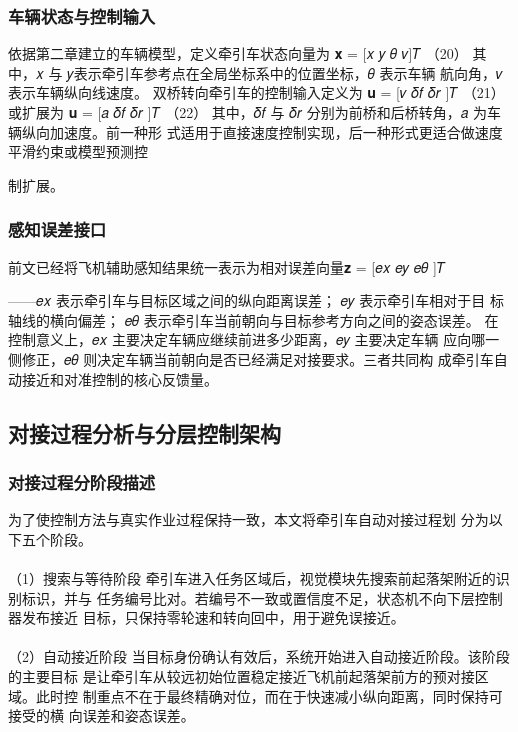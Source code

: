 \subsubsection{车辆状态与控制输入}
依据第二章建立的车辆模型，定义牵引车状态向量为
𝐱 = [𝑥 𝑦 𝜃 𝑣]𝑇              （20）
其中，𝑥 与 𝑦表示牵引车参考点在全局坐标系中的位置坐标，𝜃 表示车辆
航向角，𝑣 表示车辆纵向线速度。
双桥转向牵引车的控制输入定义为
𝐮 = [𝑣        𝛿𝑓   𝛿𝑟 ]𝑇   （21）
或扩展为
𝐮 = [𝑎   𝛿𝑓   𝛿𝑟 ]𝑇   （22）
其中，𝛿𝑓 与 𝛿𝑟 分别为前桥和后桥转角，𝑎 为车辆纵向加速度。前一种形
式适用于直接速度控制实现，后一种形式更适合做速度平滑约束或模型预测控






制扩展。
\subsubsection{感知误差接口}
前文已经将飞机辅助感知结果统一表示为相对误差向量𝐳 = [𝑒𝑥   𝑒𝑦   𝑒𝜃 ]𝑇

——𝑒𝑥 表示牵引车与目标区域之间的纵向距离误差； 𝑒𝑦 表示牵引车相对于目
标轴线的横向偏差； 𝑒𝜃 表示牵引车当前朝向与目标参考方向之间的姿态误差。
在控制意义上，𝑒𝑥 主要决定车辆应继续前进多少距离，𝑒𝑦 主要决定车辆
应向哪一侧修正，𝑒𝜃 则决定车辆当前朝向是否已经满足对接要求。三者共同构
成牵引车自动接近和对准控制的核心反馈量。




\subsection{对接过程分析与分层控制架构}
\subsubsection{对接过程分阶段描述}
为了使控制方法与真实作业过程保持一致，本文将牵引车自动对接过程划
分为以下五个阶段。
\paragraph{} （1）搜索与等待阶段
牵引车进入任务区域后，视觉模块先搜索前起落架附近的识别标识，并与
任务编号比对。若编号不一致或置信度不足，状态机不向下层控制器发布接近
目标，只保持零轮速和转向回中，用于避免误接近。
\paragraph{} （2）自动接近阶段
当目标身份确认有效后，系统开始进入自动接近阶段。该阶段的主要目标
是让牵引车从较远初始位置稳定接近飞机前起落架前方的预对接区域。此时控
制重点不在于最终精确对位，而在于快速减小纵向距离，同时保持可接受的横
向误差和姿态误差。
